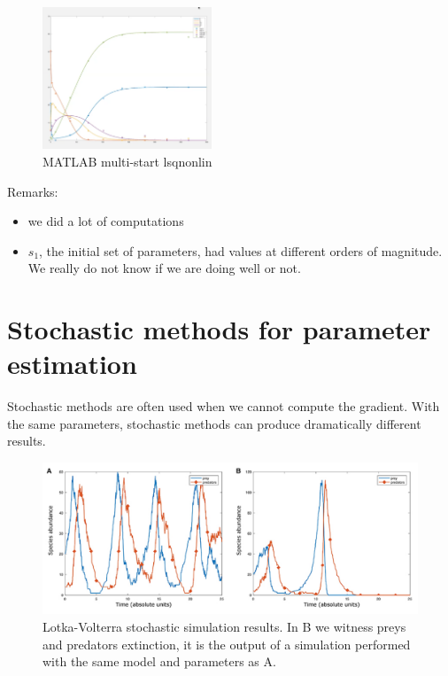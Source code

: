 \begin{figure}
\centering
\includegraphics[width=0.45\textwidth]{multistep.png}
\caption{MATLAB multi-start lsqnonlin}
\end{figure}

\noindent
Remarks:

\begin{itemize}
\tightlist
\item
  we did a lot of computations
\item
  $s_1$, the initial set of parameters, had values at different orders
  of magnitude. We really do not know if we are doing well or not.
\end{itemize}


\section{Stochastic methods for parameter estimation}

Stochastic methods are often used when we cannot compute the gradient.
With the same parameters, stochastic methods can produce dramatically
different results.

\begin{figure}
\centering
\includegraphics[width=\textwidth]{stoch_LV.png}
\caption{Lotka-Volterra stochastic simulation results. In B we witness
preys and predators extinction, it is the output of a simulation
performed with the same model and parameters as A.}
\label{fig:res}
\end{figure}

